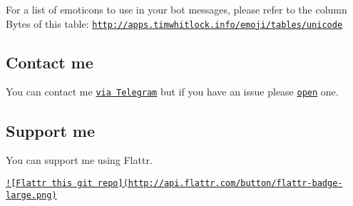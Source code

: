 For a list of emoticons to use in your bot messages, please refer to the column Bytes of this table\+: \href{http://apps.timwhitlock.info/emoji/tables/unicode}{\tt http\+://apps.\+timwhitlock.\+info/emoji/tables/unicode}

\subsection*{Contact me }

You can contact me \href{https://telegram.me/ggrillo}{\tt via Telegram} but if you have an issue please \href{https://github.com/Eleirbag89/TelegramBotPHP/issues}{\tt open} one.

\subsection*{Support me }

You can support me using Flattr.

\href{https://flattr.com/submit/auto?user_id=eleirbag89&url=https://github.com/Eleirbag89/TelegramBotPHP&title=TelegramBotPHP&language=&tags=github&category=software}{\tt !\mbox{[}Flattr this git repo\mbox{]}(http\+://api.\+flattr.\+com/button/flattr-\/badge-\/large.\+png)} 